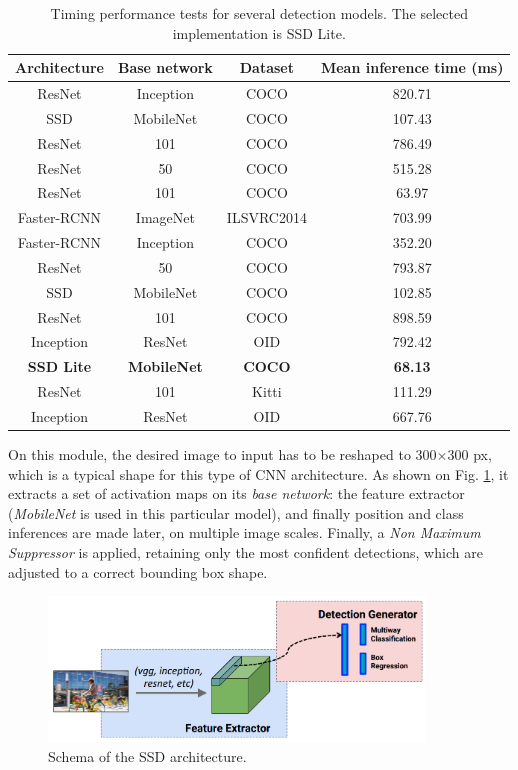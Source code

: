 \begin{table}[h]
	\centering
	\begin{tabular}{|c|c|c|c|}
		\hline
		\textbf{Architecture} & \textbf{Base network} & \textbf{Dataset} & \textbf{Mean inference time} (ms) \\ \hline
		ResNet  & Inception  & COCO & 820.71 \\ \hline
		SSD  & MobileNet  & COCO & 107.43 \\ \hline
		ResNet  & 101  & COCO & 786.49 \\ \hline
		ResNet  & 50  & COCO & 515.28 \\ \hline
		ResNet  & 101  & COCO & 63.97 \\ \hline
		Faster-RCNN  & ImageNet  & ILSVRC2014 & 703.99 \\ \hline
		Faster-RCNN  & Inception  & COCO & 352.20 \\ \hline
		ResNet  & 50  & COCO & 793.87 \\ \hline
		SSD  & MobileNet  & COCO & 102.85 \\ \hline
		ResNet  & 101  & COCO & 898.59 \\ \hline
		Inception  & ResNet  & OID & 792.42 \\ \hline
		\textbf{SSD Lite}  & \textbf{MobileNet}  & \textbf{COCO} & \textbf{68.13} \\ \hline
		ResNet  & 101  & Kitti & 111.29 \\ \hline
		Inception  & ResNet  & OID & 667.76 \\ \hline
	\end{tabular}
	\caption{Timing performance tests for several detection models. The selected implementation is SSD Lite.}
	\label{tab:model_tests}
\end{table}

On this module, the desired image to input has to be reshaped to 300$\times$300 px, which is a typical shape for this type of CNN architecture. As shown on Fig. \ref{fig:perception_ssd}, it extracts a set of activation maps on its \emph{base network}: the feature extractor (\emph{MobileNet}\cite{mobilenet} is used in this particular model), and finally position and class inferences are made later, on multiple image scales. Finally, a \emph{Non Maximum Suppressor} is applied, retaining only the most confident detections, which are adjusted to a correct bounding box shape.

\begin{figure}[h]
	\centering
	\includegraphics[width=10cm]{images/SSD_schematic}
	\caption{Schema of the SSD architecture.}
	\label{fig:perception_ssd}
\end{figure}


